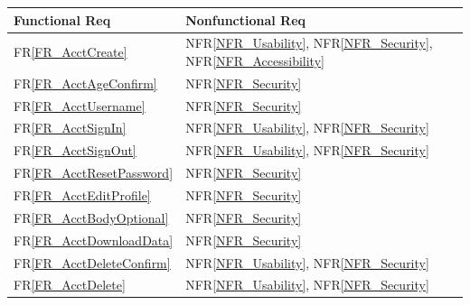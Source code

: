 \documentclass[12pt]{article}
\newcommand{\rref}[1]{FR\ref{#1}}
\newcommand{\nfrref}[1]{NFR\ref{#1}}
\begin{document}
\begin{longtable}{p{} p{}}

\toprule
Functional Req & Nonfunctional Req \\
\midrule


\rref{FR_AcctCreate} & \nfrref{NFR_Usability}, \nfrref{NFR_Security}, \nfrref{NFR_Accessibility} \\
\rref{FR_AcctAgeConfirm} & \nfrref{NFR_Security} \\
\rref{FR_AcctUsername} & \nfrref{NFR_Security} \\
\rref{FR_AcctSignIn} & \nfrref{NFR_Usability}, \nfrref{NFR_Security} \\
\rref{FR_AcctSignOut} & \nfrref{NFR_Usability}, \nfrref{NFR_Security} \\
\rref{FR_AcctResetPassword} & \nfrref{NFR_Security} \\
\rref{FR_AcctEditProfile} & \nfrref{NFR_Security} \\
\rref{FR_AcctBodyOptional} & \nfrref{NFR_Security} \\
\rref{FR_AcctDownloadData} & \nfrref{NFR_Security} \\
\rref{FR_AcctDeleteConfirm} & \nfrref{NFR_Usability}, \nfrref{NFR_Security} \\
\rref{FR_AcctDelete} & \nfrref{NFR_Usability}, \nfrref{NFR_Security} \\


\end{longtable}
\end{document}
